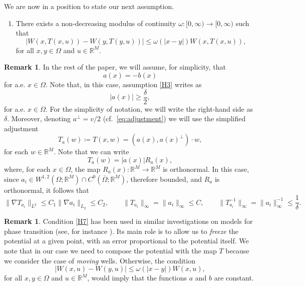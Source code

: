 \documentclass[a4paper, 11pt, reqno]{amsart}
\theoremstyle{plain}
\theoremstyle{definition}
\newtheorem{remark}[theorem]{Remark}
\theoremstyle{remark}
\newcommand{\R}{\mathbb R}
\begin{document}
We are now in a position to state our next assumption.

\begin{enumerate}[resume, label=(H\arabic*), ref=(H\arabic*)]
            \item \label{H7} There exists a non-decreasing modulus of continuity $\omega\colon[0,\infty)\to[0,\infty)$ such that
            \[
            | W(x, T(x,u)) - W(y, T(y,u)) | \leq \omega(|x-y|)  W(x, T(x,u)),
            \]
            for all $x,y \in \Omega$ and $u\in\R^M$.
\end{enumerate}

\begin{remark}\label{rem:T_symmetric}
In the rest of the paper, we will assume, for simplicity, that
\[
a(x) = -b(x)
\]
for a.e. $x\in\Omega$.
Note that, in this case, assumption \ref{H3} writes as
\[
    |a(x)|\geq \frac{\delta}{2},
\]
for a.e. $x\in\Omega$. For the simplicity of notation, we will write the right-hand side as $\delta$.
Moreover, denoting $a^\perp = v/2$ (cf.\ \eqref{eq:adjustment}) we will use the simplified adjustment
\[
    T_a(w)\coloneqq T(x,w) = ( a(x), a(x)^\perp ) \cdot w,
\]
for each $w\in\R^M$. Note that we can write
\[
    T_a(w) = |a(x)| R_a(x),
\]
where, for each $x\in\Omega$, the map $R_a(x):\R^M\to\R^M$ is orthonormal. In this case, since $a_i \in W^{1,2}(\Omega;\R^M) \cap C^0(\overline{\Omega};\R^M)$, therefore bounded, and $R_a$ is orthonormal, it follows that 
\begin{equation}\label{eq:T_a_properties}
    \| \nabla T_{a_i} \|_{L^2} \leq C_1 \| \nabla a_i \|_{L_2} \leq C_2, \qquad \| T_{a_i} \|_\infty = \| a_i \|_\infty \leq C, \qquad \| T_{a_i}^{-1} \|_\infty = \| a_i \|_\infty^{-1} \leq \frac{1}{\delta}.
\end{equation}
\end{remark}

\begin{remark}
Condition \ref{H7} has been used in similar investigations on models for phase transition (see, for instance \cite{FonPopo}).
Its main role is to allow us to \emph{freeze} the potential at a given point, with an error proportional to the potential itself.
We note that in our case we need to compose the potential with the map $T$ because we consider the case of \emph{moving} wells.
Otherwise, the condition
\[
| W(x, u) - W(y, u) | \leq \omega(|x-y|)  W(x, u),
\]
for all $x,y\in\Omega$ and $u\in\R^M$, would imply that the functions $a$ and $b$ are constant.
\end{remark}
\end{document}
